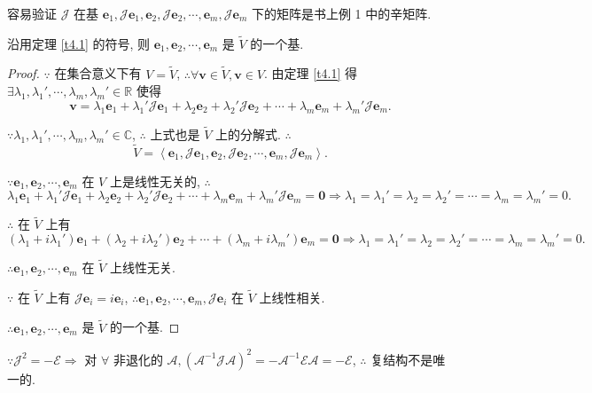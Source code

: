 \documentclass[color=black,device=normal,lang=cn,mode=geye]{elegantnote}
\begin{document}
容易验证 $\mathcal{J}$ 在基 $\boldsymbol{e}_1,\mathcal{J}\boldsymbol{e}_1,\boldsymbol{e}_2,\mathcal{J}\boldsymbol{e}_2,\cdots,\boldsymbol{e}_m,\mathcal{J}\boldsymbol{e}_m$ 下的矩阵是书上例 1 中的辛矩阵.
\begin{theorem}
    沿用定理 \ref{t4.1} 的符号, 则 $\boldsymbol{e}_1,\boldsymbol{e}_2,\cdots,\boldsymbol{e}_m$ 是 $\widetilde{V}$ 的一个基.
\end{theorem}
\begin{proof}
    $\because$ 在集合意义下有 $V=\widetilde{V}$, $\therefore\forall\boldsymbol{v}\in\widetilde{V},\boldsymbol{v}\in V$. 由定理 \ref{t4.1} 得 $\exists\lambda_1,\lambda_1',\cdots,\lambda_m,\lambda_m'\in\mathbb{R}$ 使得
    \[\boldsymbol{v}=\lambda_1\boldsymbol{e}_1+\lambda_1'\mathcal{J}\boldsymbol{e}_1+\lambda_2\boldsymbol{e}_2+\lambda_2'\mathcal{J}\boldsymbol{e}_2+\cdots+\lambda_m\boldsymbol{e}_m+\lambda_m'\mathcal{J}\boldsymbol{e}_m.\]

    $\because\lambda_1,\lambda_1',\cdots,\lambda_m,\lambda_m'\in\mathbb{C}$, $\therefore$ 上式也是 $\widetilde{V}$ 上的分解式. $\therefore$
    \[\widetilde{V}=\left<\boldsymbol{e}_1,\mathcal{J}\boldsymbol{e}_1,\boldsymbol{e}_2,\mathcal{J}\boldsymbol{e}_2,\cdots,\boldsymbol{e}_m,\mathcal{J}\boldsymbol{e}_m\right>.\]

    $\because\boldsymbol{e}_1,\boldsymbol{e}_2,\cdots,\boldsymbol{e}_m$ 在 $V$ 上是线性无关的, $\therefore$
    \[\lambda_1\boldsymbol{e}_1+\lambda_1'\mathcal{J}\boldsymbol{e}_1+\lambda_2\boldsymbol{e}_2+\lambda_2'\mathcal{J}\boldsymbol{e}_2+\cdots+\lambda_m\boldsymbol{e}_m+\lambda_m'\mathcal{J}\boldsymbol{e}_m=\boldsymbol{0}\Rightarrow\lambda_1=\lambda_1'=\lambda_2=\lambda_2'=\cdots=\lambda_m=\lambda_m'=0.\]

    $\therefore$ 在 $\widetilde{V}$ 上有
    \[(\lambda_1+i\lambda_1')\boldsymbol{e}_1+(\lambda_2+i\lambda_2')\boldsymbol{e}_2+\cdots+(\lambda_m+i\lambda_m')\boldsymbol{e}_m=\boldsymbol{0}\Rightarrow\lambda_1=\lambda_1'=\lambda_2=\lambda_2'=\cdots=\lambda_m=\lambda_m'=0.\]

    $\therefore\boldsymbol{e}_1,\boldsymbol{e}_2,\cdots,\boldsymbol{e}_m$ 在 $\widetilde{V}$ 上线性无关.

    $\because$ 在 $\widetilde{V}$ 上有 $\mathcal{J}\boldsymbol{e}_i=i\boldsymbol{e}_i$, $\therefore\boldsymbol{e}_1,\boldsymbol{e}_2,\cdots,\boldsymbol{e}_m,\mathcal{J}\boldsymbol{e}_i$ 在 $\widetilde{V}$ 上线性相关.

    $\therefore\boldsymbol{e}_1,\boldsymbol{e}_2,\cdots,\boldsymbol{e}_m$ 是 $\widetilde{V}$ 的一个基.
\end{proof}
$\because\mathcal{J}^2=-\mathcal{E}\Rightarrow$ 对 $\forall$ 非退化的 $\mathcal{A},(\mathcal{A}^{-1}\mathcal{J}\mathcal{A})^2=-\mathcal{A}^{-1}\mathcal{E}\mathcal{A}=-\mathcal{E}$, $\therefore$ 复结构不是唯一的.
\end{document}
